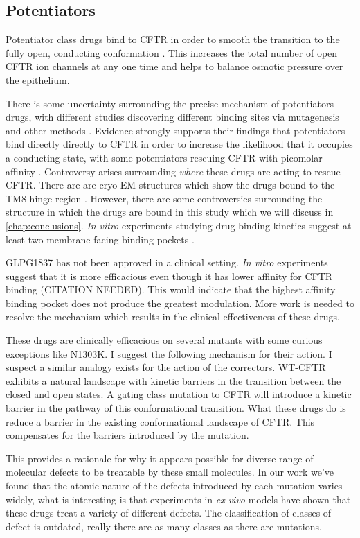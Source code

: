 \subsection{Potentiators}
Potentiator class drugs bind to CFTR in order to smooth the transition to the fully open, conducting conformation \cite{yeh2017}. This increases the total number of open CFTR ion channels at any one time and helps to balance osmotic pressure over the epithelium.

There is some uncertainty surrounding the precise mechanism of potentiators drugs, with different studies discovering different binding sites via mutagenesis and other methods \cite{yeh2019, liu2019, laselva2021}. Evidence strongly supports their findings that potentiators bind directly directly to CFTR in order to increase the likelihood that it occupies a conducting state, with some potentiators rescuing CFTR with picomolar affinity \cite{csanady2019}. Controversy arises surrounding \textit{where} these drugs are acting to rescue CFTR. There are are cryo-EM structures which show the drugs bound to the TM8 hinge region \cite{liu2019}. However, there are some controversies surrounding the structure in which the drugs are bound in this study which we will discuss in \ref{chap:conclusions}. \textit {In vitro} experiments studying drug binding kinetics suggest at least two membrane facing binding pockets \cite{csanady2019}. 

GLPG1837 has not been approved in a clinical setting. \textit {In vitro} experiments suggest that it is more efficacious even though it has lower affinity for CFTR binding (CITATION NEEDED). This would indicate that the highest affinity binding pocket does not produce the greatest modulation. More work is needed to resolve the mechanism which results in the clinical effectiveness of these drugs.  

These drugs are clinically efficacious \cite{VanGoor2014} on several mutants with some curious exceptions like N1303K. I suggest the following mechanism for their action. I suspect a similar analogy exists for the action of the correctors. WT-CFTR exhibits a natural landscape with kinetic barriers in the transition between the closed and open states. A gating class mutation to CFTR will introduce a kinetic barrier in the pathway of this conformational transition. What these drugs do is reduce a barrier in the existing conformational landscape of CFTR. This compensates for the barriers introduced by the mutation. 

This provides a rationale for why it appears possible for diverse range of molecular defects to be treatable by these small molecules. In our work we've found that the atomic nature of the defects introduced by each mutation varies widely, what is interesting is that experiments in \textit{ex vivo} models have shown that these drugs treat a variety of different defects. The classification of classes of defect is outdated, really there are as many classes as there are mutations.

